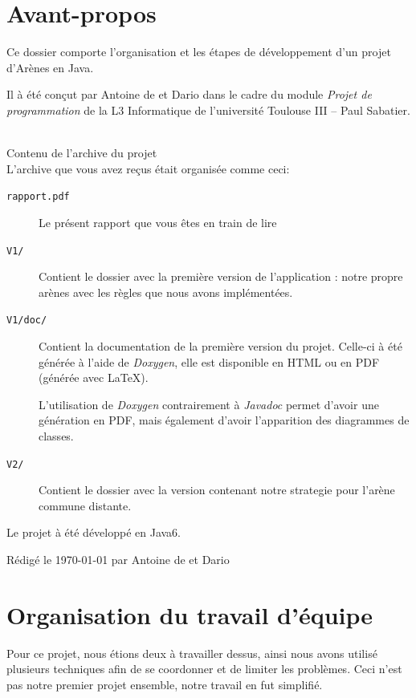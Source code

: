 \documentclass[12pt,a4paper,openany]{book}
\begin{document}
	\setcounter{tocdepth}{2}
	\setcounter{secnumdepth}{3}
	\maketitle
	\newpage
	\chapter*{Avant-propos}
	Ce dossier comporte l'organisation et les étapes de développement d'un projet d'Arènes en Java. 

	Il à été conçut par Antoine de  et Dario  dans le cadre du module \textit{Projet de programmation} de la L3
	Informatique de l'université Toulouse III -- Paul Sabatier.\\~

	\large{\sectionfont Contenu de l'archive du projet}\\
	\normalsize
	L'archive que vous avez reçus était organisée comme ceci: 
	\begin{description}
		\item[\texttt{rapport.pdf}] Le présent rapport que vous êtes en train de lire
		\item[\texttt{V1/}] Contient le dossier avec la première version de l'application : notre propre arènes avec les règles que nous avons implémentées. 
		\item[\texttt{V1/doc/}] Contient la documentation de la première version du projet. Celle-ci à été générée à l'aide de \textit{Doxygen}, elle
			est disponible en HTML ou en PDF (générée avec \LaTeX).

			L'utilisation de \textit{Doxygen} contrairement à \textit{Javadoc} permet d'avoir une génération en PDF, mais également d'avoir l'apparition des diagrammes de
			classes.
		\item[\texttt{V2/}] Contient le dossier avec la version contenant notre strategie pour l'arène commune distante.
	\end{description}

	Le projet à été développé en Java6.

	\vfill
	\footnotesize Rédigé le \today{} par Antoine de  et Dario 
	\tableofcontents
	\chapter{Organisation du travail d'équipe}
	Pour ce projet, nous étions deux à travailler dessus, ainsi nous avons utilisé plusieurs techniques afin de se coordonner et de limiter les problèmes. Ceci
	n'est pas notre premier projet ensemble, notre travail en fut simplifié.
\end{document}
